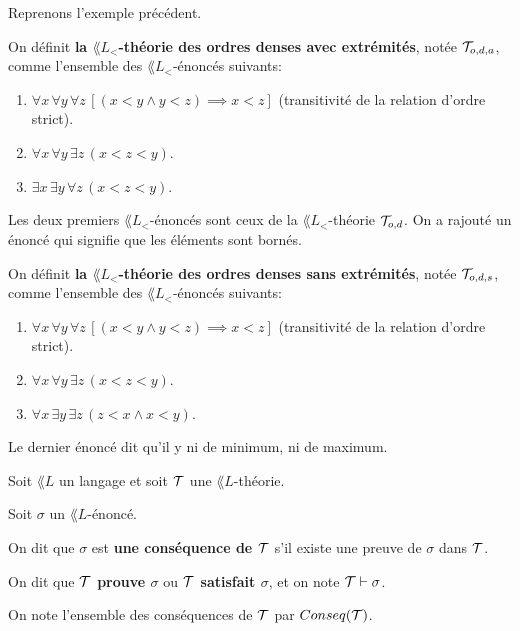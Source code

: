 \documentclass[a4paper, 12pt]{report}
\begin{document}
\begin{exemple} 
	Reprenons l'exemple précédent.

	On définit \textbf{la $\lang{L}_{<}$-théorie des ordres denses avec extrémités},
	notée $\mathcal{T}_{o, d, a}$, comme l'ensemble des $\lang{L}_{<}$-énoncés suivants:

	\begin{enumerate}
		\item $\forall x \, \forall y \, \forall z \, [(x < y \wedge y < z)
			\implies x < z]$ (transitivité de la relation d'ordre strict).
		\item $\forall x \, \forall y \, \exists z \, (x < z < y)$.
		\item $\exists x \, \exists y \, \forall z \, (x < z < y)$.
	\end{enumerate}

	Les deux premiers $\lang{L}_{<}$-énoncés sont ceux de la
	$\lang{L}_{<}$-théorie $\mathcal{T}_{o, d}$. On a rajouté un énoncé qui
	signifie que les éléments sont bornés.

	On définit \textbf{la $\lang{L}_{<}$-théorie des ordres denses sans extrémités},
	notée $\mathcal{T}_{o, d, s}$, comme l'ensemble des $\lang{L}_{<}$-énoncés suivants:

	\begin{enumerate}
		\item $\forall x \, \forall y \, \forall z \, [(x < y \wedge y < z)
			\implies x < z]$ (transitivité de la relation d'ordre strict).
		\item $\forall x \, \forall y \, \exists z \, (x < z < y)$.
		\item $\forall x \, \exists y \, \exists z \, (z < x \wedge x < y)$.
	\end{enumerate}

	Le dernier énoncé dit qu'il y ni de minimum, ni de maximum.
\end{exemple}

\begin{definition} 
	Soit $\lang{L}$ un langage et soit $\mathcal{T}$ une $\lang{L}$-théorie.

	Soit $\sigma$ un $\lang{L}$-énoncé.

	On dit que $\sigma$ est \textbf{une conséquence de $\mathcal{T}$} s'il existe une
	preuve de $\sigma$ dans $\mathcal{T}$.

	On dit que \textbf{$\mathcal{T}$ prouve $\sigma$} ou \textbf{$\mathcal{T}$
satisfait $\sigma$}, et on note $\mathcal{T} \vdash \sigma$.

	On note l'ensemble des conséquences de $\mathcal{T}$ par
	$Conseq(\mathcal{T})$.
\end{definition}
\end{document}
